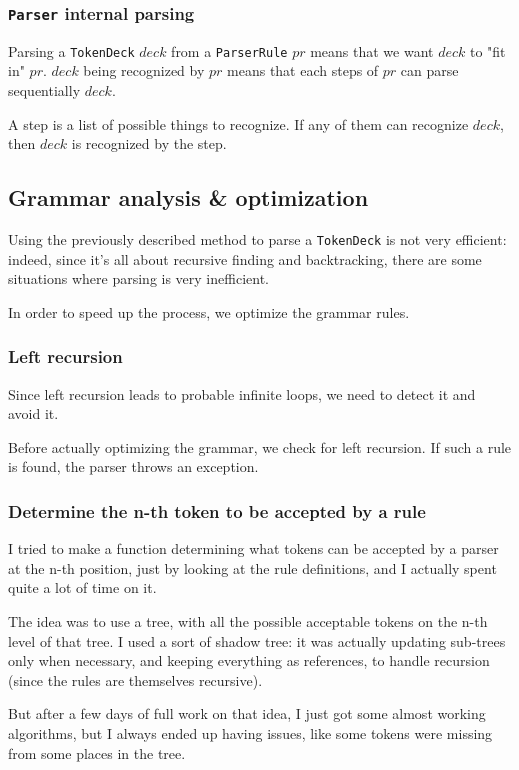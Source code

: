 \documentclass{article}
\newcommand\cc[1]{\lstinline{#1}}
\begin{document}
			\subsubsection{\cc{Parser} internal parsing}
				Parsing a \cc{TokenDeck} $deck$ from a \cc{ParserRule} $pr$ means that we want $deck$ to "fit in" $pr$. $deck$ being recognized by $pr$ means that each steps of $pr$ can parse sequentially $deck$. 

				A step is a list of possible things to recognize. If any of them can recognize $deck$, then $deck$ is recognized by the step.

		\subsection{Grammar analysis \& optimization}
			Using the previously described method to parse a \cc{TokenDeck} is not very efficient: indeed, since it's all about recursive finding and backtracking, there are some situations where parsing is very inefficient.

			In order to speed up the process, we optimize the grammar rules.

			\subsubsection{Left recursion}
			Since left recursion leads to probable infinite loops, we need to detect it and avoid it.

			Before actually optimizing the grammar, we check for left recursion. If such a rule is found, the parser throws an exception.

			\subsubsection{Determine the n-th token to be accepted by a rule}
			I tried to make a function determining what tokens can be accepted by a parser at the n-th position, just by looking at the rule definitions, and I actually spent quite a lot of time on it.

			The idea was to use a tree, with all the possible acceptable tokens on the n-th level of that tree. I used a sort of shadow tree: it was actually updating sub-trees only when necessary, and keeping everything as references, to handle recursion (since the rules are themselves recursive).

			But after a few days of full work on that idea, I just got some almost working algorithms, but I always ended up having issues, like some tokens were missing from some places in the tree.
\end{document}

